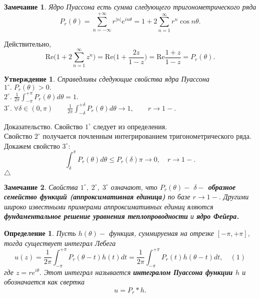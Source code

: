 \documentclass[12 pt, a4 paper]{article}
\theoremstyle{plain}   \newtheorem{Pro}{Задача}
\newtheorem{Sta}{Утверждение}
\newtheorem{Def}{Определение}
\newtheorem{Rem}{Замечание}
\begin{document}
\begin{Rem}							
Ядро Пуассона есть сумма следующего тригонометрического ряда
$$
  P_r (\theta )=\sum _{n=-\infty}^{+\infty}
  r^{|n|}e^{in\theta}=1+2\sum_{n=1}^{\infty}
  r^n \cos n\theta .
$$
\end{Rem}
Действительно,
$$
  \mathrm{Re} \Biggl ( 1+2\sum_{n=1}^{\infty}z^n \Biggr ) =
  \mathrm{Re} \Biggl (1+\frac{2z}{1-z} \Biggr )=
  \mathrm{Re}\frac{1+z}{1-z}=P_r (\theta ).
$$
\begin{Sta}
Справедливы сдедующие свойства ядра Пуассона
\\
$ 1^{\circ}. \; P_r (\theta )>0. $
\\
$ 2^{\circ}. \; \frac{1}{2\pi}\int_{-\pi}^{+\pi}
P_r (\theta )d\theta =1. $
\\
$ 3^{\circ}. \; \forall \delta \in (0, \pi )
\qquad \frac{1}{2\pi}\int_{-\delta} ^{ +\delta}
P_r(\theta ) d\theta \longrightarrow 1,
\qquad r \rightarrow 1- . $
\end{Sta}
{\Large Доказательство.}
Свойство
$ 1^{\circ} $
следует из определения.
\\
Свойство
$ 2^{\circ} $
получается почленным интегрированием тригонометрического ряда.
\\
Докажем свойство
$ 3^{\circ}: $
$$
  \int_{\delta}^{\pi}P_r (\theta )d\theta
  \leq P_r (\delta ) \pi \rightarrow 0,
  \quad r \rightarrow 1-.
$$
$ \triangle $
\begin{Rem}
Свойства
$ 1^{\circ}, \; 2^{\circ}, \; 3^{\circ} $
означают, что
$ P_r (\theta ) - $
{\bfseries $ \delta - $ образное семейство функций
(аппроксимативная единица)}
по базе
$ r \rightarrow 1- . $
Другими широко известными примерами аппроксимативных единиц
яляются
{\bfseries фундаментальное решение уравнения теплопроводности}
и
{\bfseries ядро Фейера.}
\end{Rem}
\begin{Def}
Пусть
$ h(\theta )- $
функция, суммируемая на отрезке
$ [-\pi , +\pi ] , $
тогда существует интеграл Лебега
$$
  u(z)=\frac{1}{2\pi}\int _{-\pi}^{+\pi}
  P_r (\theta -t )h(t)dt =
  \frac{1}{2\pi} \int _{-\pi}^{+\pi}
  P_r (t)h(\theta -t ) dt , \quad (1)
$$
где
$ z=re^{i\theta} . $
Этот интеграл называется
{\bfseries интегралом Пуассона функции
$ h $ }
и обозначается как свертка
$$
  u=P_r \ast h .
$$
\end{Def}
\end{document}
